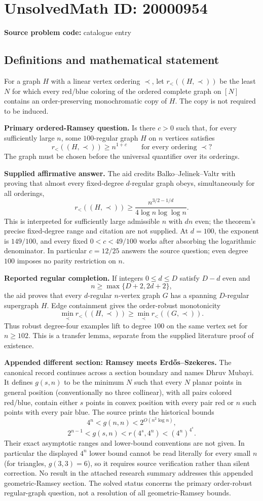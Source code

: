 \documentclass[11pt]{article}
\begin{document}
\section*{UnsolvedMath ID: 20000954}
\textbf{Source problem code:} catalogue entry
\subsection{Definitions and mathematical statement}
For a graph $H$ with a linear vertex ordering $\prec$, let $r_<((H,\prec))$ be the least $N$ for which every red/blue coloring of the ordered complete graph on $[N]$ contains an order-preserving monochromatic copy of $H$. The copy is not required to be induced.

\textbf{Primary ordered-Ramsey question.} Is there $c>0$ such that, for every sufficiently large $n$, some $100$-regular graph $H$ on $n$ vertices satisfies
\[
 r_<((H,\prec))\geq n^{1+c}\qquad\text{for every ordering }\prec?
\]
The graph must be chosen before the universal quantifier over its orderings.

\textbf{Supplied affirmative answer.} The aid credits Balko--Jelinek--Valtr with proving that almost every fixed-degree $d$-regular graph obeys, simultaneously for all orderings,
\[
 r_<((H,\prec))\geq\frac{n^{3/2-1/d}}{4\log n\log\log n}.
\]
This is interpreted for sufficiently large admissible $n$ with $dn$ even; the theorem's precise fixed-degree range and citation are not supplied. At $d=100$, the exponent is $149/100$, and every fixed $0<c<49/100$ works after absorbing the logarithmic denominator. In particular $c=12/25$ answers the source question; even degree $100$ imposes no parity restriction on $n$.

\textbf{Reported regular completion.} If integers $0\leq d\leq D$ satisfy $D-d$ even and
\[
 n\geq\max\{D+2,2d+2\},
\]
the aid proves that every $d$-regular $n$-vertex graph $G$ has a spanning $D$-regular supergraph $H$. Edge containment gives the order-robust monotonicity
\[
 \min_\prec r_<((H,\prec))\geq\min_\prec r_<((G,\prec)).
\]
Thus robust degree-four examples lift to degree $100$ on the same vertex set for $n\geq102$. This is a transfer lemma, separate from the supplied literature proof of existence.

\textbf{Appended different section: Ramsey meets Erd\H{o}s--Szekeres.} The canonical record continues across a section boundary and names Dhruv Mubayi. It defines $g(s,n)$ to be the minimum $N$ such that every $N$ planar points in general position (conventionally no three collinear), with all pairs colored red/blue, contain either $s$ points in convex position with every pair red or $n$ such points with every pair blue. The source prints the historical bounds
\[
 4^n<g(n,n)<2^{O(n^2\log n)},
\]
\[
 2^{n-1}<g(s,n)<r(4^s,4^n)<(4^n)^{4^s}.
\]
Their exact asymptotic ranges and lower-bound conventions are not given. In particular the displayed $4^n$ lower bound cannot be read literally for every small $n$ (for triangles, $g(3,3)=6$), so it requires source verification rather than silent correction. No result in the attached research summary addresses this appended geometric-Ramsey section. The solved status concerns the primary order-robust regular-graph question, not a resolution of all geometric-Ramsey bounds.
\end{document}
